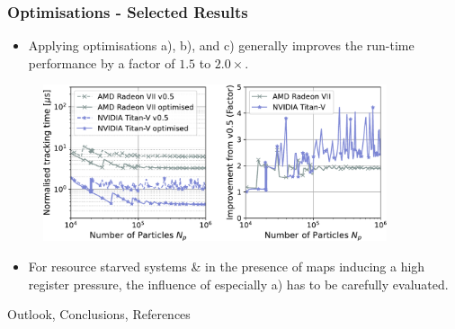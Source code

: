 \documentclass{beamer}
\begin{document}
\begin{frame}
    \frametitle{Optimisations - Selected Results}
    \begin{itemize}
        \item Applying optimisations { a), b), and c)} generally improves the run-time performance by a factor of $1.5$ to $2.0 \times$.
    \end{itemize}
    \begin{figure}[H]
        \centering
        \includegraphics[width=0.9\textwidth]{poster_images/fig_performance_optimisation}
    \end{figure}
    \begin{itemize}
        \item For resource starved systems \& in the presence of maps inducing a high register pressure, the influence of especially { a)} has to be carefully evaluated.
    \end{itemize}
\end{frame}

\begin{frame}
    \begin{center}
    {\HUGE{}Outlook, Conclusions, References}
    \end{center}
\end{frame}
\end{document}
